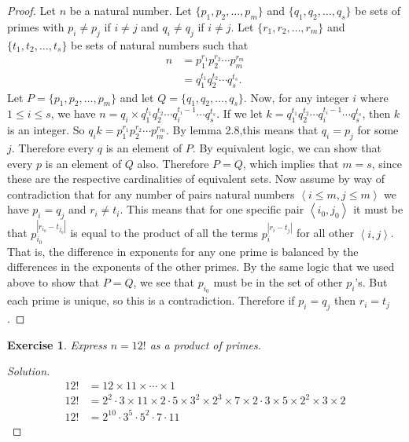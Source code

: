 \documentclass[12pt,leqno]{article}
\numberwithin{equation}{section}
\newtheorem{exer}[thm]{Exercise}
\theoremstyle{definition}
\newcommand{\card}[1]{\left| #1 \right|}
\newcommand{\pair}[2]{\left\langle #1, #2 \right\rangle}
\begin{document}
\begin{proof}[Proof]
Let $n$ be a natural number.  Let $\{p_1, p_2, \hdots, p_m\}$ and $\{q_1, q_2, \hdots, q_s\}$ be sets of primes with $p_i \neq p_j$ if $i \neq j$ and $q_i \neq q_j$ if $i \neq j$. Let $\{r_1, r_2, \hdots, r_m\}$ and $\{t_1, t_2, \hdots, t_s\}$ be sets of natural numbers such that
\begin{align*}
n & = p_1^{r_1}p_2^{r_2}\cdots p_m^{r_m} \\
  & = q_1^{t_1}q_2^{t_2}\cdots q_s^{t_s}.
\end{align*}
Let $P = \{p_1, p_2, \hdots, p_m\}$ and let $Q = \{q_1, q_2, \hdots, q_s\}$.  Now, for any integer $i$ where $1 \leq i \leq s$, we have $n = q_i \times q_1^{t_1}q_2^{t_2}\cdots q_i^{t_i-1} \cdots q_s^{t_s}$.  If we let $k = q_1^{t_1}q_2^{t_2}\cdots q_i^{t_i-1} \cdots q_s^{t_s}$, then $k$ is an integer.  So $q_ik = p_1^{r_1}p_2^{r_2}\cdots p_m^{r_m}$.  By lemma 2.8,this means that $q_i = p_j$ for some $j$. Therefore every $q$ is an element of $P$.  By equivalent logic, we can show that every $p$ is an element of $Q$ also.  Therefore $P = Q$, which implies that $m = s$, since these are the respective cardinalities of equivalent sets.  Now assume by way of contradiction that for any number of pairs natural numbers $\pair{i \leq m}{j \leq m}$ we have $p_i = q_j$ and $r_i \neq t_i$.  This means that for one specific pair $\pair{i_0}{j_0}$ it must be that $p_{i_0}^{\card{r_{i_0}-t_{j_0}}}$ is equal to the product of all the terms $p_i^{\card{r_i-t_j}}$ for all other $\pair{i}{j}$.  That is, the difference in exponents for any one prime is balanced by the differences in the exponents of the other primes.  By the same logic that we used above to show that $P = Q$, we see that $p_{i_0}$ must be in the set of other $p_i$'s.  But each prime is unique, so this is a contradiction.  Therefore if $p_i = q_j$ then $r_i = t_j$.
\end{proof}

\setcounter{thm}{9}

\pagebreak

\begin{exer}
Express $n = 12!$ as a product of primes.
\end{exer}

\begin{proof}[Solution]
\begin{align*}
12! &= 12 \times 11 \times \cdots \times 1\\
12! &= 2^2\cdot 3 \times 11 \times 2\cdot 5 \times 3^2 \times 2^3 \times 7 \times 2\cdot 3 \times 5 \times 2^2 \times 3 \times 2\\
12! &= 2^{10} \cdot 3^5 \cdot 5^2 \cdot 7 \cdot 11
\end{align*}
\end{proof}
\end{document}
